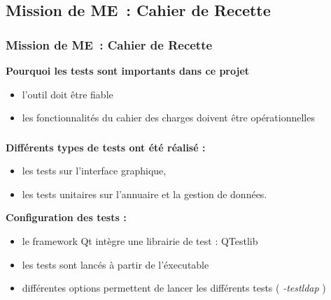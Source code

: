 \subsection{Mission de ME~: Cahier de Recette}
\begin{frame}
\frametitle{Mission de ME~: Cahier de Recette}
\begin{block}{\textbf{Pourquoi les tests sont importants dans ce projet}}
\begin{itemize}
\item l'outil doit être fiable
\item les fonctionnalités du cahier des charges doivent être opérationnelles
\end{itemize}
\end{block}
\end{frame}

\begin{frame}
\frametitle{}
\begin{block}{\textbf{Différents types de tests ont été réalisé : }}
\begin{itemize}
\item les tests sur l'interface graphique,
\item les tests unitaires sur l'annuaire et la gestion de données.
\end{itemize}
\end{block}
\begin{block}{\textbf{Configuration des tests : }}
\begin{itemize}
\item le framework Qt intègre une librairie de test : QTestlib
\item les tests sont lancés à partir de l'éxecutable
\item différentes options permettent de lancer les différents tests ( \emph{-testldap} )
\end{itemize}
\end{block}
\end{frame}

